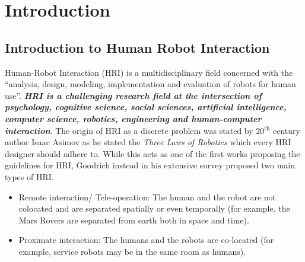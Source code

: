 
\chapter{Introduction} %

\label{Chapter1} %



\section{Introduction to Human Robot Interaction}
	Human-Robot Interaction (HRI) is a multidisciplinary field concerned with the “analysis, design, modeling, implementation and evaluation of robots for human use”\cite{fong2003collaboration}. \textbf{\emph{HRI is a challenging research field at the intersection of psychology, cognitive science, social sciences, artificial intelligence, computer science, robotics, engineering and human-computer interaction}}\cite{dautenhahn2007methodology}. The origin of HRI as a discrete problem was stated by 20$^{\text{th}}$ century author Isaac Asimov\cite{IssacAsimov} as he stated the \emph{Three Laws of Robotics} which every HRI designer should adhere to. While this acts as one of the first works proposing the guidelines for HRI, Goodrich \cite{goodrich2007human} instead in his extensive survey proposed two main types of HRI.
\begin{itemize}
\item Remote interaction/ Tele-operation: The human and the robot are not colocated and are separated spatially or even temporally (for example, the Mars Rovers are separated from earth both in space and time). 
\item Proximate interaction: The humans and the robots are co-located (for example, service robots may be in the same room as humans).
\end{itemize}
